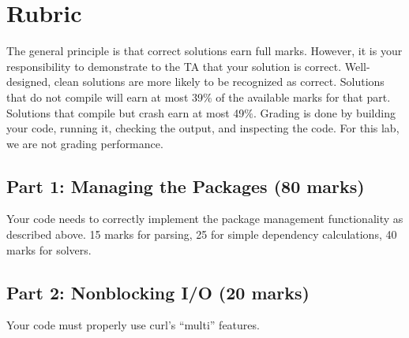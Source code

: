 \documentclass[12pt]{article}
\renewcommand{\_}{\kern-1.5pt\textunderscore\kern-1.5pt}
\begin{document}
\section*{Rubric}
The general principle is that correct solutions earn full marks. However, it is your responsibility to demonstrate to the TA that your solution is correct. Well-designed, clean solutions are more likely to be recognized as correct. Solutions that do not compile will earn at most 39$\%$  of the available marks for that part. Solutions that compile but crash earn at most 49$\%$. Grading is done by building your code, running it, checking the output, and inspecting the code. For this lab, we are not grading performance. \par

\subsection*{Part 1: Managing the Packages (80 marks) } Your code needs to correctly implement the package management functionality as described above. 15 marks for parsing, 25 for simple dependency calculations, 40 marks for solvers. \par

\subsection*{Part 2: Nonblocking I/O (20 marks) } Your code must properly use curl's ``multi''  features. \par %
\end{document}
